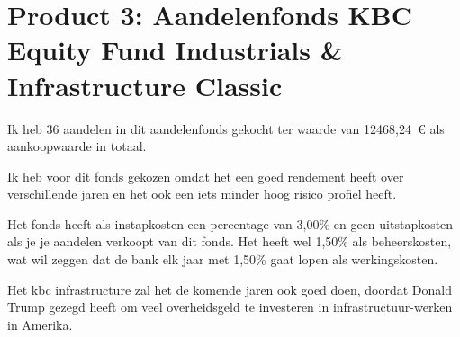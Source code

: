 \begin{comment}
\subsubsection{Voordelen}

\begin{enumerate}
  \item Stemrecht op de algemene vergadering
  \item Recht op een deel van de uitkeerbare winst
  \item Voorkeurrecht bij kapitaalverhoging
  \item Recht op informatie
  \item Recht op een deel van de liquidatiewaarde
\end{enumerate}

\todo[inline]{Nog de voor en nadelen opsommen van aandelen.}
\end{comment}



\section{Product 3: Aandelenfonds KBC Equity Fund Industrials \& Infrastructure Classic}


Ik heb 36 aandelen in dit aandelenfonds gekocht ter waarde van 12468,24~\euro{} als aankoopwaarde in totaal.

Ik heb voor dit fonds gekozen omdat het een goed rendement heeft over verschillende jaren en het ook een iets minder hoog risico profiel heeft.

Het fonds heeft als instapkosten een percentage van 3,00\% en geen uitstapkosten als je je aandelen verkoopt van dit fonds. Het heeft wel 1,50\% als beheerskosten, wat wil zeggen dat de bank elk jaar met 1,50\% gaat lopen als werkingskosten.

Het kbc infrastructure zal het de komende jaren ook goed doen, doordat Donald Trump gezegd heeft om veel overheidsgeld te investeren in infrastructuur-werken in Amerika.

